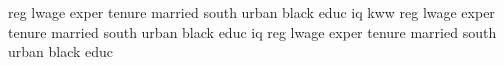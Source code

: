 reg lwage exper tenure married south urban black educ iq kww
reg lwage exper tenure married south urban black educ iq
reg lwage exper tenure married south urban black educ
